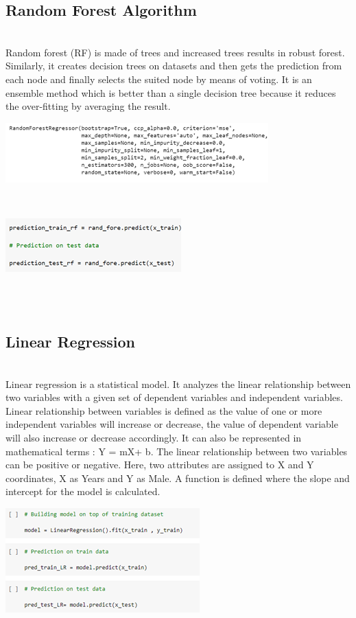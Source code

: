 \documentclass[journal,twoside,web]{ieeecolor}
\begin{document}
\subsection{Random Forest Algorithm}
\\
Random forest (RF) is made of trees and increased trees results in robust forest. Similarly, it creates decision trees on datasets and then gets the prediction from each node and finally selects the suited node by means of voting. It is an ensemble method which is better than a single decision tree because it reduces the over-fitting by averaging the result.
\\
\begin{center}
\includegraphics[scale=0.60]{Picture8.png}
\end{center}
\\
\begin{center}
\includegraphics[scale=0.60]{Picture9.png}
\end{center}
\\
\\
\subsection{Linear Regression}
\\
Linear regression is a statistical model. It analyzes the linear relationship between two variables with a given set of dependent variables and independent variables. Linear relationship between variables is defined as the value of one or more independent variables will increase or decrease, the value of dependent variable will also increase or decrease accordingly. It can also be represented in mathematical terms : Y = mX+ b. The linear relationship between two variables can be positive or negative. Here, two attributes are assigned to X and Y coordinates, X as Years and Y as Male. A function is defined where the slope and intercept for the model is calculated.
\\
\begin{center}
\includegraphics[scale=0.60]{Picture13new.png}
\end{center}
\\
\end{document}
